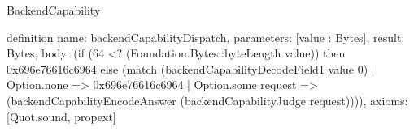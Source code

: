 \begin{lexlean}{BackendCapability}
\begin{semanticmodule}
definition{
  name: backendCapabilityDispatch,
  parameters: [value : Bytes],
  result: Bytes,
  body: (if (64 <? (Foundation.Bytes::byteLength value)) then 0x696e76616c6964 else (match (backendCapabilityDecodeField1 value 0)
    | Option.none => 0x696e76616c6964
    | Option.some request => (backendCapabilityEncodeAnswer (backendCapabilityJudge request)))),
  axioms: [Quot.sound, propext]
}
\end{semanticmodule}
\end{lexlean}
